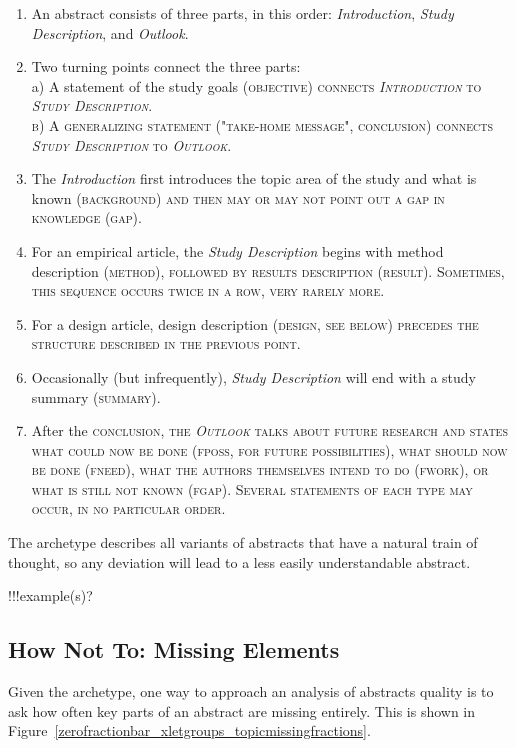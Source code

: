 \documentclass[10pt,journal,compsoc]{IEEEtran}
\newcommand{\Cb}[1]{\bgroup\scshape #1\egroup}  %
\begin{document}
\begin{enumerate}
\item An abstract consists of three parts, in this order:
   \emph{Introduction}, \emph{Study Description}, and \emph{Outlook}. 
\item Two turning points connect the three parts:\\
   a) A statement of the study goals (\Cb{objective}) connects \emph{Introduction} 
      to \emph{Study Description}.\\
   b) A generalizing statement ("take-home message", \Cb{conclusion}) 
     connects \emph{Study Description} to \emph{Outlook}.
\item The \emph{Introduction} first introduces the topic area of the study and what is known (\Cb{background})
   and then may or may not point out a gap in knowledge (\Cb{gap}).
\item For an empirical article, the \emph{Study Description} begins with
   method description (\Cb{method}), followed by results description (\Cb{result}).
   Sometimes, this sequence occurs twice in a row, very rarely more.
\item For a design article, design description (\Cb{design}, see below) precedes the structure
   described in the previous point.
\item Occasionally (but infrequently), \emph{Study Description} will end with a study summary (\Cb{summary}).
\item After the \Cb{conclusion}, the \emph{Outlook} talks about future research and states 
   what could now be done (\Cb{fposs}, for future possibilities),
   what should now be done (\Cb{fneed}),
   what the authors themselves intend to do (\Cb{fwork}), or
   what is still not known (\Cb{fgap}).
   Several statements of each type may occur, in no particular order.
\end{enumerate}

The archetype describes all variants of abstracts that have a natural train of thought,
so any deviation will lead to a less easily understandable abstract.

!!!example(s)?


\subsection{How Not To: Missing Elements}

Given the archetype, one way to approach an analysis of abstracts quality is to ask
how often key parts of an abstract are missing entirely.
This is shown in Figure~\ref{zerofractionbar_xletgroups_topicmissingfractions}.
\end{document}
